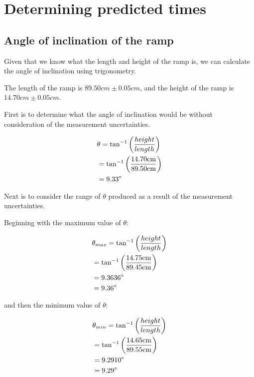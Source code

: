 \documentclass[letterpaper, 12pt]{article}
\begin{document}
\section{Determining predicted times}

\subsection{Angle of inclination of the ramp}

Given that we know what the length and height of the ramp is, we can calculate
the angle of inclination using trigonometry.

The length of the ramp is $89.50 \unit{cm} \pm 0.05\unit{cm}$, and the height of the ramp is
\\$14.70 \unit{cm} \pm 0.05\unit{cm}$.

    First is to determine what the angle of inclination would be without consideration
    of the measurement uncertainties.

    \begin{align*}
         & \theta = \tan^{-1}\left( \frac{height}{length} \right)
        \\
         & = \tan^{-1}\left(\frac{14.70 \unit{cm}}{89.50 \unit{cm}}\right)
        \\
         & = 9.33\degree
    \end{align*}

    Next is to consider the range of $\theta$ produced as a result of the measurement
    uncertainties.

    Beginning with the maximum value of $\theta$:

    \begin{align*}
         & \theta_{max} = \tan^{-1}\left( \frac{height}{length} \right)
        \\
         & = \tan^{-1}\left(\frac{14.75 \unit{cm}}{89.45 \unit{cm}}\right)
        \\
         & = 9.3636\degree
        \\
         & = 9.36\degree
    \end{align*}

    and then the minimum value of $\theta$:

    \begin{align*}
         & \theta_{min} = \tan^{-1}\left( \frac{height}{length} \right)
        \\
         & = \tan^{-1}\left(\frac{14.65 \unit{cm}}{89.55 \unit{cm}}\right)
        \\
         & = 9.2910\degree
        \\
         & = 9.29\degree
    \end{align*}
\end{document}
